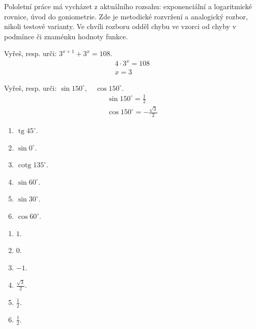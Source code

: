 \documentclass[11pt,a4paper]{article}
\begin{document}
Pololetní práce má vycházet z aktuálního rozsahu: exponenciální a logaritmické rovnice, úvod do goniometrie. Zde je metodické rozvržení a analogický rozbor, nikoli testové varianty.
Ve chvíli rozboru odděl chybu ve vzorci od chyby v podmínce či znaménku hodnoty funkce.
\begin{prikladReseniBox}[title={Příklad 1}]
Vyřeš, resp. urči: $3^{x+1}+3^x=108$.
\tcblower
\[\begin{aligned}4\cdot3^x=108 \\ x=3\end{aligned}\]
\end{prikladReseniBox}
\begin{prikladReseniBox}[title={Příklad 2}]
Vyřeš, resp. urči: $\sin150^\circ,\quad\cos150^\circ$.
\tcblower
\[\begin{aligned}\sin150^\circ=\frac{1}{2} \\ \cos150^\circ=-\frac{\sqrt3}{2}\end{aligned}\]
\end{prikladReseniBox}
\begin{zadaniReseniBox}[title={Samostatná práce 1}]
\begin{enumerate}[label=\alph*)]
\item $\operatorname{tg}45^\circ$.
\item $\sin0^\circ$.
\item $\operatorname{cotg}135^\circ$.
\item $\sin60^\circ$.
\item $\sin30^\circ$.
\item $\cos60^\circ$.
\end{enumerate}
\tcblower
\begin{enumerate}[label=\alph*)]
\item $1$.
\item $0$.
\item $-1$.
\item $\frac{\sqrt3}{2}$.
\item $\frac{1}{2}$.
\item $\frac{1}{2}$.
\end{enumerate}
\end{zadaniReseniBox}
\end{document}
